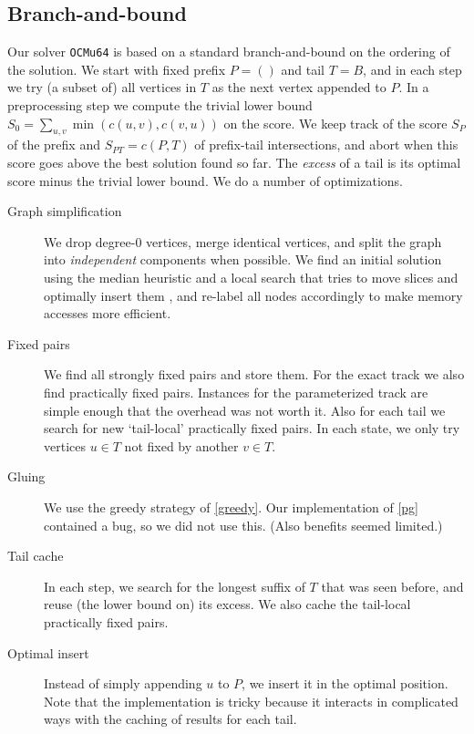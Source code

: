 \documentclass[a4paper,UKenglish,cleveref, autoref, thm-restate]{lipics-v2021}
\begin{document}
\subsection{Branch-and-bound}
Our solver \texttt{OCMu64} is based on a standard branch-and-bound on the ordering of the
solution.  We start with fixed prefix $P=()$ and tail $T=B$, and in each step we try (a
subset of) all vertices in $T$ as the next vertex appended to $P$.
In a preprocessing step we compute the trivial lower bound $S_0 =
\sum_{u,v}\min(c(u,v),c(v,u))$ \cite[Lemma 4]{eades_median_2}\cite[Fact 3]{dujmovic_2004} on the score.
We keep track of the score $S_P$ of the prefix and $S_{PT}=c(P, T)$ of
prefix-tail intersections, and abort when this score goes above the best
solution found so far. The \emph{excess} of a tail is its optimal score minus
the trivial lower bound. We do a number of optimizations.

\begin{description}
  \item[Graph simplification] We drop degree-$0$ vertices, merge identical
    vertices, and split the graph into \emph{independent} components
    \cite[Corollary 2]{dujmovic_2004} when
    possible. We find an initial solution using the median heuristic \cite{eades_median,eades_median_2} and a local search that tries to move
    slices and optimally insert them \cite{makinen_experiments,eades_heuristics}, and re-label all nodes accordingly to make
    memory accesses more efficient.
  \item[Fixed pairs] We find all strongly fixed pairs and store them. For the
    exact track we also find practically fixed pairs. Instances for the parameterized
    track are simple enough that the overhead was not worth it. Also for each
    tail we search for new `tail-local' practically fixed pairs. In each state, we only
    try vertices $u\in T$ not fixed by another $v\in T$.
  \item[Gluing] We use the greedy strategy of \cref{greedy}. Our implementation
    of \cref{pg} contained a bug, so we did not use this. (Also benefits
    seemed limited.)
  \item[Tail cache] In each step, we search for the longest suffix of $T$ that
    was seen before, and reuse (the lower bound on) its excess. We also
    cache the tail-local practically fixed pairs.
  \item[Optimal insert] Instead of simply appending $u$ to $P$, we
    insert it in the optimal position. Note that the
    implementation is tricky because it interacts in complicated ways with
    the caching of results for each tail.
\end{description}


\end{document}
